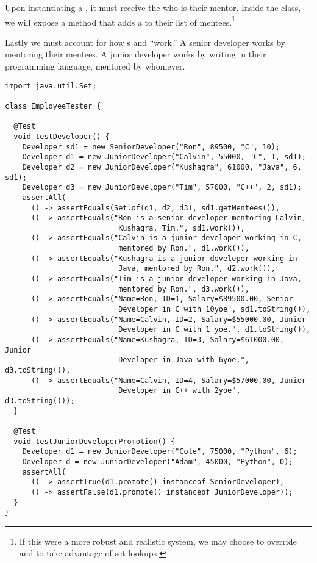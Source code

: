 Upon instantiating a , it must receive the  who is their mentor. 
Inside the  class, we will expose a method that adds a  to their list of mentees.\footnote{If this were a more robust and realistic system, we may choose to override  and  to take advantage of set lookups.}

Lastly we must account for how s and  ``work.'' 
A senior developer works by mentoring their mentees. 
A junior developer works by writing in their programming language, mentored by whomever.

\begin{lstlisting}[language=MyJava]
import java.util.Set;

class EmployeeTester {
   
  @Test
  void testDeveloper() {
    Developer sd1 = new SeniorDeveloper("Ron", 89500, "C", 10);
    Developer d1 = new JuniorDeveloper("Calvin", 55000, "C", 1, sd1);
    Developer d2 = new JuniorDeveloper("Kushagra", 61000, "Java", 6, sd1);
    Developer d3 = new JuniorDeveloper("Tim", 57000, "C++", 2, sd1);
    assertAll(
      () -> assertEquals(Set.of(d1, d2, d3), sd1.getMentees()),
      () -> assertEquals("Ron is a senior developer mentoring Calvin, 
                          Kushagra, Tim.", sd1.work()),
      () -> assertEquals("Calvin is a junior developer working in C, 
                          mentored by Ron.", d1.work()),
      () -> assertEquals("Kushagra is a junior developer working in 
                          Java, mentored by Ron.", d2.work()),
      () -> assertEquals("Tim is a junior developer working in Java, 
                          mentored by Ron.", d3.work()),
      () -> assertEquals("Name=Ron, ID=1, Salary=$89500.00, Senior 
                          Developer in C with 10yoe", sd1.toString()),
      () -> assertEquals("Name=Calvin, ID=2, Salary=$55000.00, Junior 
                          Developer in C with 1 yoe.", d1.toString()),
      () -> assertEquals("Name=Kushagra, ID=3, Salary=$61000.00, Junior 
                          Developer in Java with 6yoe.", d3.toString()),
      () -> assertEquals("Name=Calvin, ID=4, Salary=$57000.00, Junior 
                          Developer in C++ with 2yoe", d3.toString()));
  }

  @Test
  void testJuniorDeveloperPromotion() {
    Developer d1 = new JuniorDeveloper("Cole", 75000, "Python", 6);
    Developer d = new JuniorDeveloper("Adam", 45000, "Python", 0);
    assertAll(
      () -> assertTrue(d1.promote() instanceof SeniorDeveloper),
      () -> assertFalse(d1.promote() instanceof JuniorDeveloper));
  }
}
\end{lstlisting}


